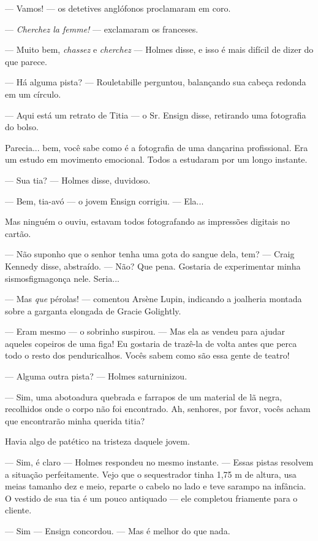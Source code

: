 --- Vamos! --- os detetives anglófonos proclamaram em coro.

--- \emph{Cherchez la femme!} --- exclamaram os franceses.

--- Muito bem, \emph{chassez} e \emph{cherchez} --- Holmes disse, e isso
é mais difícil de dizer do que parece.

--- Há alguma pista? --- Rouletabille perguntou, balançando sua cabeça
redonda em um círculo.

--- Aqui está um retrato de Titia --- o Sr. Ensign disse, retirando uma
fotografia do bolso.

Parecia... bem, você sabe como é a fotografia de uma dançarina
profissional. Era um estudo em movimento emocional. Todos a estudaram
por um longo instante.

--- Sua tia? --- Holmes disse, duvidoso.

--- Bem, tia-avó --- o jovem Ensign corrigiu. --- Ela...

Mas ninguém o ouviu, estavam todos fotografando as impressões digitais
no cartão.

--- Não suponho que o senhor tenha uma gota do sangue dela, tem? ---
Craig Kennedy disse, abstraído. --- Não? Que pena. Gostaria de
experimentar minha sismosfigmagonça nele. Seria...

--- Mas \emph{que} pérolas! --- comentou Arsène Lupin, indicando a
joalheria montada sobre a garganta elongada de Gracie Golightly.

--- Eram mesmo --- o sobrinho suspirou. --- Mas ela as vendeu para
ajudar aqueles copeiros de uma figa! Eu gostaria de trazê-la de volta
antes que perca todo o resto dos penduricalhos. Vocês sabem como são
essa gente de teatro!

--- Alguma outra pista? --- Holmes saturninizou.

--- Sim, uma abotoadura quebrada e farrapos de um material de lã negra,
recolhidos onde o corpo não foi encontrado. Ah, senhores, por favor,
vocês acham que encontrarão minha querida titia?

Havia algo de patético na tristeza daquele jovem.

--- Sim, é claro --- Holmes respondeu no mesmo instante. --- Essas
pistas resolvem a situação perfeitamente. Vejo que o sequestrador tinha
1,75 m de altura, usa meias tamanho dez e meio, reparte o cabelo no lado
e teve sarampo na infância. O vestido de sua tia é um pouco antiquado
--- ele completou friamente para o cliente.

--- Sim --- Ensign concordou. --- Mas é melhor do que nada.

